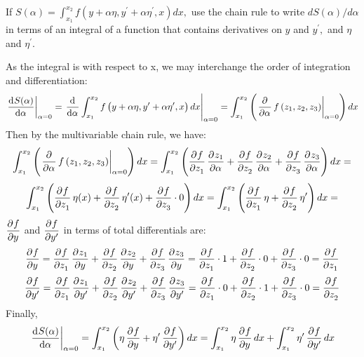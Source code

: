 \begin{p}
If $S(\alpha)=\int_{x_{1}}^{x_{2}} f\left(y+\alpha \eta, y^{\prime}+\alpha \eta^{\prime}, x\right) d x,$ use the chain rule to write $d S(\alpha) / d \alpha$ in terms of an integral of a function that contains derivatives on $y$ and $y^{\prime},$ and $\eta$ and $\eta^{\prime}$.
\end{p}
\begin{s}
As the integral is with respect to x, we may interchange the order of integration and differentiation:
\[\left. \dod{S(\alpha)}{\alpha}\right|_{\alpha = 0} = \left.\dod{}{\alpha}\int_{x_{1}}^{x_{2}} f\left(y+\alpha \eta, y^{\prime}+\alpha \eta^{\prime}, x\right) dx\right|_{\alpha = 0} = \int_{x_1}^{x_2} \left(\left.\dpd{}{\alpha}f\left(z_1, z_2, z_3\right)\right|_{\alpha = 0}\right) dx \]
Then by the multivariable chain rule, we have:
\[\int_{x_1}^{x_2} \left(\left.\dpd{}{\alpha}f\left(z_1, z_2, z_3\right)\right|_{\alpha = 0}\right) dx = \int_{x_{1}}^{x_{2}} \left( \dpd{f}{z_1}\dpd{z_1}{\alpha}+\dpd{f}{z_2}\dpd{z_2}{\alpha}+\dpd{f}{z_3}\dpd{z_3}{\alpha} \right) dx =\]
\[\int_{x_{1}}^{x_{2}} \left( \dpd{f}{z_1}\eta(x)+\dpd{f}{z_2}\eta'(x)+\dpd{f}{z_3}\cdot 0 \right) dx = \int_{x_{1}}^{x_{2}} \left( \dpd{f}{z_1}\eta+\dpd{f}{z_2}\eta' \right) dx =\]
$\dpd{f}{y}$ and $\dpd{f}{y'}$ in terms of total differentials are:
\[\dpd{f}{y}=\dpd{f}{z_1}\dpd{z_1}{y}+\dpd{f}{z_2}\dpd{z_2}{y}+\dpd{f}{z_3}\dpd{z_3}{y}=\dpd{f}{z_1}\cdot 1+\dpd{f}{z_2}\cdot 0+\dpd{f}{z_3}\cdot 0=\dpd{f}{z_1}\]
\[\dpd{f}{y'}=\dpd{f}{z_1}\dpd{z_1}{y'}+\dpd{f}{z_2}\dpd{z_2}{y'}+\dpd{f}{z_3}\dpd{z_3}{y'}=\dpd{f}{z_1}\cdot 0+\dpd{f}{z_2}\cdot 1+\dpd{f}{z_3}\cdot 0=\dpd{f}{z_2}\]
Finally,
\[\left.\dod{S(\alpha)}{\alpha}\right|_{\alpha = 0} = \int_{x_{1}}^{x_{2}} \left(\eta\dpd{f}{y} + \eta'\dpd{f}{y'}\right)dx = \int_{x_1}^{x_2} \eta\dpd{f}{y} dx + \int_{x_1}^{x_2} \eta'\dpd{f}{y'}dx\]
\end{s}

